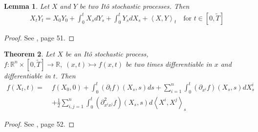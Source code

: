 \documentclass[12pt]{article}
\newtheorem{theorem}{Theorem}[section]
\newtheorem{lemma}[theorem]{Lemma}
\begin{document}
	\begin{lemma}
		Let $X$ and $Y$ be two Itô stochastic processes. Then
		\begin{align*}
			X_t Y_t = X_0 Y_0 + \int_{0}^{t}X_sdY_s + \int_{0}^{t}Y_sdX_s + \left\langle X, Y\right\rangle_t \quad \text{for }t \in \left[0,\tilde{T}\right]
		\end{align*}
	\end{lemma}
	\begin{proof}
		See \cite{fima2Lecture}, page 51. %
	\end{proof}
	\begin{theorem}
		Let $X$ be an Itô stochastic process, $f: \mathbb{R}^n \times [0,\tilde{T}] \rightarrow \mathbb{R}, \; (x,t) \rightarrowtail f(x, t)$ be two times differentiable in $x$ and differentiable in $t$. Then
		\begin{align*}
			f(X_t, t) = \;&f(X_0, 0) + \int_{0}^{t}(\partial_{t}f)(X_s, s)ds + \sum_{i=1}^{n}\int_{0}^{t}(\partial_{x^i}f)(X_s, s)dX^i_s \\
			&+ \frac{1}{2} \sum_{i,j=1}^{n}\int_{0}^{t}(\partial^2_{x^ix^j}f)(X_s, s)d\left\langle X^i, X^j\right\rangle_s
		\end{align*}
		
	\end{theorem}
	\begin{proof}
		See \cite{fima2Lecture}, page 52. %
	\end{proof}
	
\end{document}
